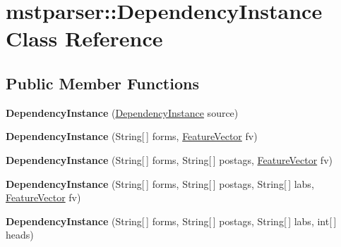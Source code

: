 \hypertarget{classmstparser_1_1DependencyInstance}{
\section{mstparser::DependencyInstance Class Reference}
\label{classmstparser_1_1DependencyInstance}
}
\subsection*{Public Member Functions}
\begin{DoxyCompactItemize}
\item 
\hypertarget{classmstparser_1_1DependencyInstance_a45ec9f375394fa7cc22483970bbf38e8}{
{\bfseries DependencyInstance} (\hyperlink{classmstparser_1_1DependencyInstance}{DependencyInstance} source)}
\label{classmstparser_1_1DependencyInstance_a45ec9f375394fa7cc22483970bbf38e8}

\item 
\hypertarget{classmstparser_1_1DependencyInstance_aec1b327185fa05f4bd4d0e4a458b694c}{
{\bfseries DependencyInstance} (String\mbox{[}$\,$\mbox{]} forms, \hyperlink{classmstparser_1_1FeatureVector}{FeatureVector} fv)}
\label{classmstparser_1_1DependencyInstance_aec1b327185fa05f4bd4d0e4a458b694c}

\item 
\hypertarget{classmstparser_1_1DependencyInstance_a1f9ad7a6172cdccca8221fe22d96b9a6}{
{\bfseries DependencyInstance} (String\mbox{[}$\,$\mbox{]} forms, String\mbox{[}$\,$\mbox{]} postags, \hyperlink{classmstparser_1_1FeatureVector}{FeatureVector} fv)}
\label{classmstparser_1_1DependencyInstance_a1f9ad7a6172cdccca8221fe22d96b9a6}

\item 
\hypertarget{classmstparser_1_1DependencyInstance_ae5fd18b39aea0886e3d95c6111a7d29a}{
{\bfseries DependencyInstance} (String\mbox{[}$\,$\mbox{]} forms, String\mbox{[}$\,$\mbox{]} postags, String\mbox{[}$\,$\mbox{]} labs, \hyperlink{classmstparser_1_1FeatureVector}{FeatureVector} fv)}
\label{classmstparser_1_1DependencyInstance_ae5fd18b39aea0886e3d95c6111a7d29a}

\item 
\hypertarget{classmstparser_1_1DependencyInstance_a8e11992eac2eaa8be46e40f672338431}{
{\bfseries DependencyInstance} (String\mbox{[}$\,$\mbox{]} forms, String\mbox{[}$\,$\mbox{]} postags, String\mbox{[}$\,$\mbox{]} labs, int\mbox{[}$\,$\mbox{]} heads)}
\label{classmstparser_1_1DependencyInstance_a8e11992eac2eaa8be46e40f672338431}


\end{DoxyCompactItemize}
